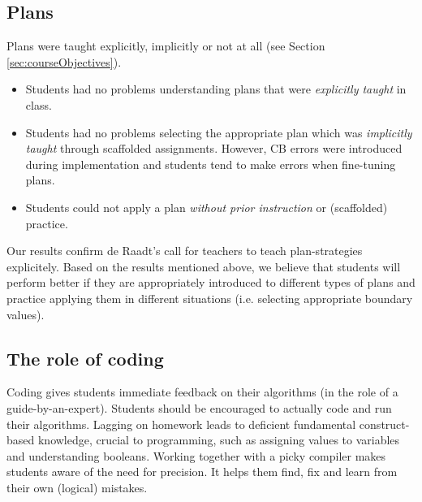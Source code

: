 \subsection*{Plans}
    Plans
    were taught explicitly, implicitly or not at all (see Section \ref{sec:courseObjectives}).
    \begin{itemize}[leftmargin=1em]
    \item Students had no problems understanding plans that were
        \emph{explicitly taught} in class.


    \item Students had no problems selecting the appropriate plan which was
        \emph{implicitly taught} through scaffolded assignments. However,
        CB errors were introduced during implementation and
        students tend to make errors when fine-tuning plans.


    \item Students could not apply a plan \emph{without prior instruction}
        or (scaffolded) practice.

    \end{itemize}


     Our results confirm de Raadt's call for
    teachers to teach plan-strategies explicitely\cite{deRaadt2008}. Based on the results mentioned above, we believe that students will perform
    better if they are appropriately introduced to different types of plans
    and practice applying them in different situations (i.e. selecting
    appropriate boundary values).





\subsection*{The role of coding}
    Coding gives students immediate feedback
    on their algorithms (in the role of a guide-by-an-expert). Students should be encouraged to actually code and run their algorithms.
    Lagging on homework leads to deficient fundamental construct-based
    knowledge, crucial to programming, such as assigning values to
    variables and understanding booleans. Working
    together with a picky compiler makes students aware of the need for
    precision. It helps
    them find, fix and learn from their own (logical) mistakes.


